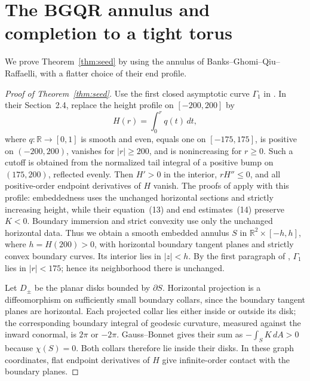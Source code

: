 \documentclass[11pt]{amsart}
\theoremstyle{definition}
\newcommand{\R}{\mathbb R}
\begin{document}
\section{The BGQR annulus and completion to a tight torus}
\label{sec:seed}

We prove Theorem~\ref{thm:seed} by using the annulus of
Banks--Ghomi--Qiu--Raffaelli, with a flatter choice of their end profile.

\begin{proof}[Proof of Theorem~\ref{thm:seed}]
Use the first closed asymptotic curve $\Gamma_1$ in \cite{BGQR}.
In their Section~2.4, replace the height profile on $[-200,200]$ by
\[
 H(r)=\int_0^r q(t)\,dt,
\]
where $q:\R\to[0,1]$ is smooth and even, equals one on $[-175,175]$,
is positive on $(-200,200)$, vanishes for $|r|\ge200$, and is
nonincreasing for $r\ge0$. Such a cutoff is obtained from the
normalized tail integral of a positive bump on $(175,200)$,
reflected evenly.
Then $H'>0$ in the interior, $rH''\le0$, and all positive-order
endpoint derivatives of $H$ vanish. The proofs of
\cite[Propositions~3.2--3.3]{BGQR} apply with this profile:
embeddedness uses the unchanged horizontal sections and strictly
increasing height, while their equation~(13) and end estimates~(14)
preserve $K<0$. Boundary immersion and strict convexity use only
the unchanged horizontal data. Thus we obtain a smooth embedded
annulus $S$ in $\R^2\times[-h,h]$, where $h=H(200)>0$, with
horizontal boundary tangent planes and strictly convex boundary
curves. Its interior lies in $|z|<h$. By the first paragraph of
\cite[Section~4]{BGQR}, $\Gamma_1$ lies in $|r|<175$; hence its
neighborhood there is unchanged.

Let $D_\pm$ be the planar disks bounded by $\partial S$.
Horizontal projection is a diffeomorphism on sufficiently small
boundary collars, since the boundary tangent planes are horizontal.
Each projected collar lies either inside or outside its disk;
the corresponding boundary integral of geodesic curvature, measured
against the inward conormal, is $2\pi$ or $-2\pi$.
Gauss--Bonnet gives their sum as $-\int_S K\,dA>0$ because
$\chi(S)=0$. Both collars therefore lie inside their disks.
In these graph coordinates, flat endpoint derivatives of $H$
give infinite-order contact with the boundary planes.


\end{proof}
\end{document}

